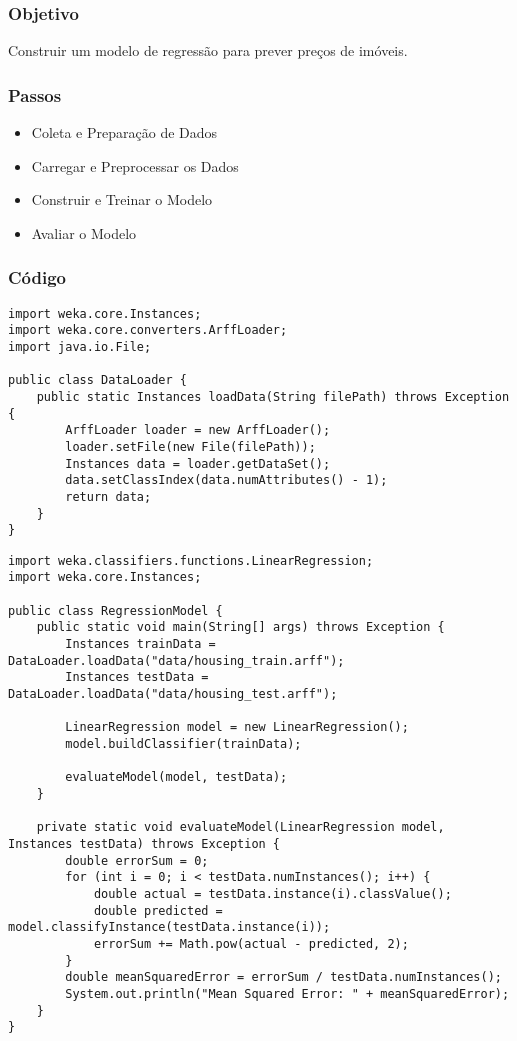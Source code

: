 \documentclass[a4paper,12pt]{book}
\begin{document}
\subsubsection{Objetivo}
Construir um modelo de regressão para prever preços de imóveis.

\subsubsection{Passos}
\begin{itemize}
    \item Coleta e Preparação de Dados
    \item Carregar e Preprocessar os Dados
    \item Construir e Treinar o Modelo
    \item Avaliar o Modelo
\end{itemize}

\subsubsection{Código}
\begin{lstlisting}
import weka.core.Instances;
import weka.core.converters.ArffLoader;
import java.io.File;

public class DataLoader {
    public static Instances loadData(String filePath) throws Exception {
        ArffLoader loader = new ArffLoader();
        loader.setFile(new File(filePath));
        Instances data = loader.getDataSet();
        data.setClassIndex(data.numAttributes() - 1);
        return data;
    }
}
\end{lstlisting}

\begin{lstlisting}
import weka.classifiers.functions.LinearRegression;
import weka.core.Instances;

public class RegressionModel {
    public static void main(String[] args) throws Exception {
        Instances trainData = DataLoader.loadData("data/housing_train.arff");
        Instances testData = DataLoader.loadData("data/housing_test.arff");

        LinearRegression model = new LinearRegression();
        model.buildClassifier(trainData);

        evaluateModel(model, testData);
    }

    private static void evaluateModel(LinearRegression model, Instances testData) throws Exception {
        double errorSum = 0;
        for (int i = 0; i < testData.numInstances(); i++) {
            double actual = testData.instance(i).classValue();
            double predicted = model.classifyInstance(testData.instance(i));
            errorSum += Math.pow(actual - predicted, 2);
        }
        double meanSquaredError = errorSum / testData.numInstances();
        System.out.println("Mean Squared Error: " + meanSquaredError);
    }
}
\end{lstlisting}
\end{document}
